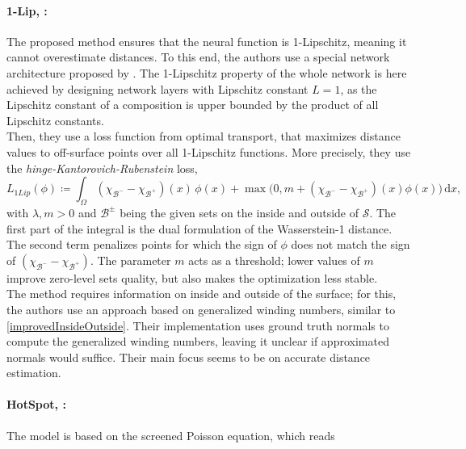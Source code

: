 \documentclass[12pt,openany]{book}
\def\S{\mathcal{S}}
\theoremstyle{plainnormal}
\theoremstyle{remark}
\begin{document}
\paragraph{1-Lip, \cite{1lip}:} The proposed method ensures that the neural function is 1-Lipschitz, meaning it cannot overestimate distances. To this end, the authors use a special network architecture proposed by \cite{araujo2023unifiedalgebraicperspectivelipschitz}. The 1-Lipschitz property of the whole network is here achieved by designing network layers with Lipschitz constant $L=1$, as the Lipschitz constant of a composition is upper bounded by the product of all Lipschitz constants.\\
Then, they use a loss function from optimal transport, that maximizes distance values to off-surface points over all 1-Lipschitz functions. More precisely, they use the \emph{hinge-Kantorovich-Rubenstein} loss, 
$$
L_{1Lip}(\phi) \coloneqq \int_\Omega (\chi_{\mathcal B^-}-\chi_{\mathcal B^+})(x)\,\phi(x)  + \max\big(0,m+ (\chi_{\mathcal B^-}-\chi_{\mathcal B^+})(x)\phi(x)\big)\,\mathrm{d}x,
$$
with $\lambda,m >0$ and $\mathcal{B}^\pm$ being the given sets on the inside and outside of $\S$. The first part of the integral is the dual formulation of the Wasserstein-1 distance. The second term  penalizes points for which the sign of $\phi$ does not match the sign of $ (\chi_{\mathcal B^-}-\chi_{\mathcal B^+})$. The parameter $m$ acts as a threshold; lower values of $m$ improve zero-level sets quality, but also makes the optimization less stable.\\
The method requires information on inside and outside of the surface; for this, the authors use an approach based on generalized winding numbers, similar to \cref{improvedInsideOutside}. Their implementation uses ground truth normals to compute the generalized winding numbers, leaving it unclear if approximated normals would suffice. Their main focus seems to be on accurate distance estimation.
\paragraph{HotSpot, \cite{hotspot}:} The model is based on the screened Poisson equation, which reads
\end{document}
